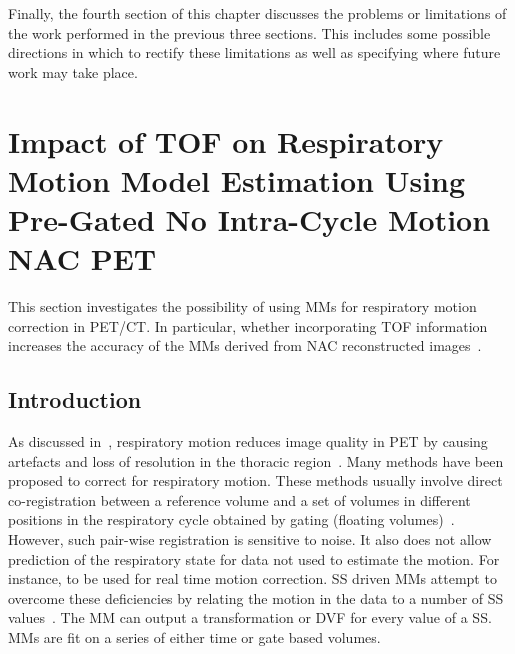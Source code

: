         Finally, the fourth section of this chapter discusses the problems or limitations of the work performed in the previous three sections. This includes some possible directions in which to rectify these limitations as well as specifying where future work may take place.
    
    
    \section{Impact of TOF on Respiratory Motion Model Estimation Using Pre-Gated No Intra-Cycle Motion NAC PET} \label{sec:impact_of_tof_on_respiratory_motion_model_estimation_using_pre_gated_no_intra_cycle_motion_nac_pet}
        This section investigates the possibility of using \glspl{MM} for respiratory motion correction in \gls{PET}/\gls{CT}. In particular, whether incorporating \gls{TOF} information increases the accuracy of the \glspl{MM} derived from \gls{NAC} reconstructed images~\parencite{Whitehead2019ImpactPET}.
        
        \subsection{Introduction} \label{sec:impact_of_tof_on_respiratory_motion_model_estimation_using_pre_gated_no_intra_cycle_motion_nac_pet_introduction}
        As discussed in~, respiratory motion reduces image quality in \gls{PET} by causing artefacts and loss of resolution in the thoracic region~\parencite{Nehmeh2008a}. Many methods have been proposed to correct for respiratory motion. These methods usually involve direct co-registration between a reference volume and a set of volumes in different positions in the respiratory cycle obtained by gating (floating volumes)~\parencite{Oliveira2014}. However, such pair-wise registration is sensitive to noise. It also does not allow prediction of the respiratory state for data not used to estimate the motion. For instance, to be used for real time motion correction. \gls{SS} driven \glspl{MM} attempt to overcome these deficiencies by relating the motion in the data to a number of \gls{SS} values~\parencite{McClelland2013}. The \gls{MM} can output a transformation or \gls{DVF} for every value of a \gls{SS}. \glspl{MM} are fit on a series of either time or gate based volumes.

